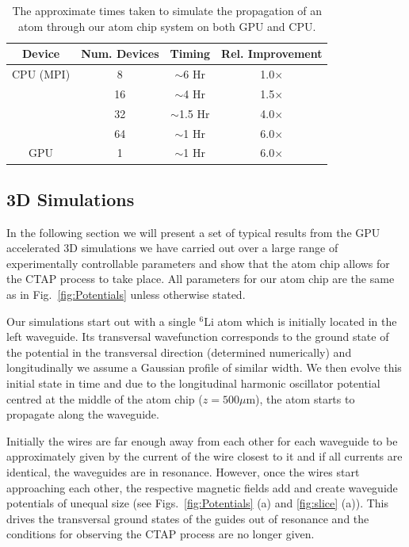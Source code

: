 \begin{table}[tb]
  \begin{center}
    \begin{tabular}{|c||c|c|c|}
      \hline
      Device & Num. Devices & Timing  & Rel. Improvement \\ \hline
      CPU (MPI) & 8 & $\sim$6 Hr & 1.0$\times$ \\ 
      & 16 & $\sim$4 Hr & 1.5$\times$ \\
      & 32 & $\sim$1.5 Hr & 4.0$\times$ \\ 
      & 64 & $\sim$1 Hr & 6.0$\times$ \\ \hline
      GPU & 1 & $\sim$1 Hr & 6.0$\times$ \\ \hline
    \end{tabular}
  \end{center}
   \caption{The approximate times taken to simulate the propagation of an atom through our atom chip system on both GPU and CPU.}
   \label{tbl:timing}
\end{table}
     

\subsection{3D Simulations}
\label{sec:Results}
In the following section we will present a set of typical results from the GPU accelerated 3D simulations we have carried out over a large range of experimentally controllable parameters and show that the atom chip allows for the CTAP process to take place. All parameters for our atom chip are the same as in Fig.~\ref{fig:Potentials} unless otherwise stated.

Our simulations start out with a single $^{6}$Li atom which is initially located in the left waveguide. Its transversal wavefunction corresponds to the ground state of the potential in the transversal direction (determined numerically) and longitudinally we assume a Gaussian profile of similar width. We then evolve this initial state in time and due to the longitudinal harmonic oscillator potential centred at the middle of the atom chip ($z=500 \mu$m), the atom starts to propagate along the waveguide. 

Initially the wires are far enough away from each other for each waveguide to be approximately given by the current of the wire closest to it and if all currents are identical, the waveguides are in resonance. However, once the wires start approaching each other, the respective magnetic fields add and create waveguide potentials of unequal size (see Figs.~\ref{fig:Potentials} (a) and \ref{fig:slice} (a)). This drives the transversal ground states of the guides out of resonance and the conditions for observing the CTAP process are no longer given.
 
